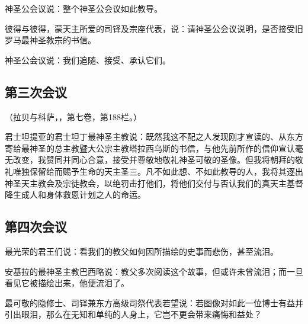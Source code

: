 神圣公会议说：整个神圣公会议如此教导。\par

彼得与彼得，蒙天主所爱的司铎及宗座代表，说：请神圣公会议说明，是否接受旧罗马最神圣教宗的书信。\par

神圣公会议说：我们追随、接受、承认它们。\par

\par


\subsection{第三次会议}

（拉贝与科萨，，第七卷，第188栏。）\par

君士坦提亚的君士坦丁最神圣主教说：既然我这不配之人发现刚才宣读的、从东方寄给最神圣的总主教暨大公宗主教塔拉西乌斯的书信，与他先前所作的信仰宣认毫无改变，我赞同并同心合意，接受并尊敬地敬礼神圣可敬的圣像。但我将朝拜的敬礼唯独保留给而赐予生命的天主圣三。凡不如此想、不如此教导的人，我将其逐出神圣天主教会及宗徒教会，以绝罚击打他们，将他们交付与否认我们的真天主基督降生成人和身体救恩计划之人的命运。\par


\subsection{第四次会议}

\par

最光荣的君王们说：看我们的教父如何因所描绘的史事而悲伤，甚至流泪。\par

安基拉的最神圣主教巴西略说：教父多次阅读这个故事，但或许未曾流泪；而一旦看见它被描绘出来，他便流泪了。\par

最可敬的隐修士、司铎兼东方高级司祭代表若望说：若图像对如此一位博士有益并引出眼泪，那么在无知和单纯的人身上，它岂不更会带来痛悔和益处？\par

